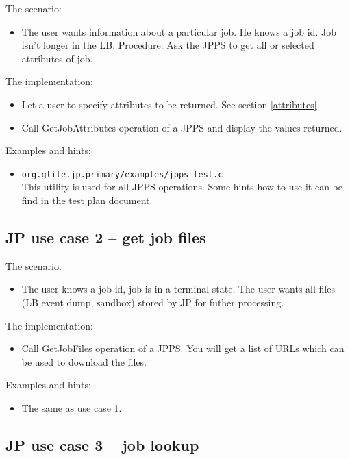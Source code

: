 The scenario:
\begin{itemize}
\item The user wants information about a particular job. He knows a
  job id. Job isn't longer in the LB. Procedure: Ask the JPPS to get all
  or selected attributes of job.
\end{itemize}

The implementation:
\begin{itemize}
 \item Let a user to specify attributes to be returned. See section
  \ref{attributes}.
 \item Call GetJobAttributes operation of a JPPS and display the values
  returned.
\end{itemize}

Examples and hints:
\begin{itemize}
 \item \texttt{org.glite.jp.primary/examples/jpps-test.c}\\
  This utility is used for all JPPS operations. Some hints how to use it
  can be find in the test plan document.
\end{itemize}

\subsection{JP use case 2 -- get job files}

The scenario:
\begin{itemize}
 \item The user knows a job id, job is in a terminal state. The user wants
  all files (LB event dump, sandbox) stored by JP for futher processing.
\end{itemize}

The implementation:
\begin{itemize}
 \item Call GetJobFiles operation of a JPPS. You will get a list of URLs
  which can be used to download the files.
\end{itemize}

Examples and hints:
\begin{itemize}
 \item The same as use case 1.
\end{itemize}

\subsection{JP use case 3 -- job lookup}

